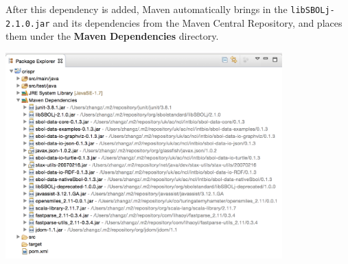 After this dependency is added, Maven automatically brings in the  {\tt libSBOLj-2.1.0.jar} and its dependencies from the Maven Central Repository, and places them under the {\bf Maven Dependencies} directory.
\begin{center}
  \includegraphics[width=0.8\textwidth]{figures/addMavenDependency3}
\end{center}


